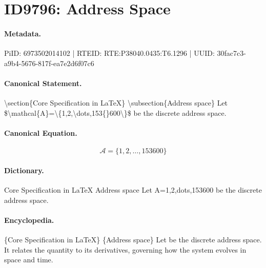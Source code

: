 \section*{ID9796: Address Space}
\paragraph{Metadata.}
PiID: 6973502014102 | RTEID: RTE:P38040.0435:T6.1296 | UUID: 30fac7c3-a9b4-5676-817f-ea7e2d6f07c6

\paragraph{Canonical Statement.}
\textbackslash{}section\{Core Specification in LaTeX\} \textbackslash{}subsection\{Address space\} Let \$\textbackslash{}mathcal\{A\}=\textbackslash{}\{1,2,\textbackslash{}dots,153\{\}600\textbackslash{}\}\$ be the discrete address space.

\paragraph{Canonical Equation.}
\[
\mathcal{A}=\{1,2,\dots,153{}600\}
\]

\paragraph{Dictionary.}
Core Specification in LaTeX Address space Let A=1,2,dots,153600 be the discrete address space.

\paragraph{Encyclopedia.}
\{Core Specification in LaTeX\} \{Address space\} Let be the discrete address space. It relates the quantity to its derivatives, governing how the system evolves in space and time.
